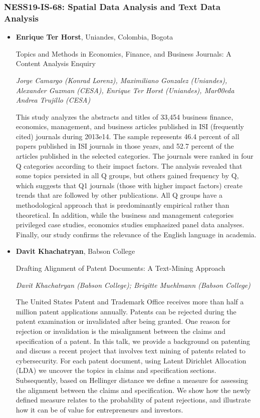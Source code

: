 \subsubsection*{NESS19-IS-68: Spatial Data Analysis and Text Data Analysis}

\begin{itemize}
\item \textbf{Enrique Ter Horst}, Uniandes, Colombia, Bogota

Topics and Methods in Economics, Finance, and Business Journals: A Content Analysis Enquiry

\emph{\footnotesize Jorge Camargo (Konrad Lorenz), Maximiliano Gonzalez (Uniandes), Alexander Guzman (CESA), Enrique Ter Horst (Uniandes), Mar\u00eda Andrea Trujillo (CESA)}

This study analyzes the abstracts and titles of 33,454 business finance, economics, management, and business articles published in ISI (frequently cited) journals during 2013e14. The sample represents 46.4 percent of all papers published in ISI journals in those years, and 52.7 percent of the articles published in the selected categories. The journals were ranked in four Q categories according to their impact factors. The analysis revealed that some topics persisted in all Q groups, but others gained frequency by Q, which suggests that Q1 journals (those with higher impact factors) create trends that are followed by other publications. All Q groups have a methodological approach that is predominantly empirical rather than theoretical. In addition, while the business and management categories privileged case studies, economics studies emphasized panel data analyses. Finally, our study confirms the relevance of the English language in academia.

\item \textbf{Davit Khachatryan}, Babson College

Drafting Alignment of Patent Documents: A Text-Mining Approach

\emph{\footnotesize Davit Khachatryan (Babson College); Brigitte Muehlmann (Babson College)}

The United States Patent and Trademark Office receives more than half a million patent applications annually. Patents can be rejected during the patent examination or invalidated after being granted. One reason for rejection or invalidation is the misalignment between the claims and specification of a patent. In this talk, we provide a background on patenting and discuss a recent project that involves text mining of patents related to cybersecurity. For each patent document, using Latent Dirichlet Allocation (LDA) we uncover the topics in claims and specification sections. Subsequently, based on Hellinger distance we define a measure for assessing the alignment between the claims and specification. We show how the newly defined measure relates to the probability of patent rejections, and illustrate how it can be of value for entrepreneurs and investors.


\end{itemize}
